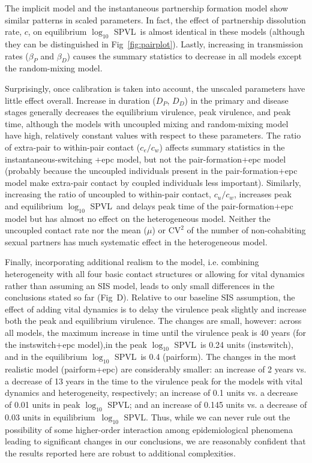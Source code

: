 \documentclass[10pt,letterpaper]{article}
\renewcommand{\figurename}{Fig}
\newcommand{\Lspvl}{$\log_{10}$ SPVL}
\begin{document}
The implicit model and the instantaneous partnership formation model show similar patterns in scaled parameters. In fact, the effect of partnership dissolution rate, $c$, on equilibrium \Lspvl\ is almost identical
in these models (although they can be
distinguished in \figurename~\ref{fig:pairplot}).
Lastly, increasing in transmission rates ($\beta_P$ and $\beta_D$)
causes the summary statistics to decrease in all models except the random-mixing model.

Surprisingly, once calibration
is taken into account, the unscaled parameters have little effect overall.
Increase in duration ($D_P$, $D_D$) in the primary and disease stages generally decreases the equilibrium virulence, peak virulence, and peak time,
although the models with uncoupled mixing and random-mixing model have high, relatively constant values with respect to these parameters.
The ratio of extra-pair to within-pair contact ($c_e/c_w$) affects
summary statistics in the instantaneous-switching +epc model, but not the pair-formation+epc
model (probably because the uncoupled individuals present in the pair-formation+epc
model make extra-pair contact by coupled individuals less important).
Similarly, increasing the ratio of uncoupled to within-pair contact, $c_u/c_w$, increases peak and equilibrium \Lspvl\ and delays peak time of the pair-formation+epc model but has almost no effect on the heterogeneous model.
Neither the uncoupled contact rate nor
the mean ($\mu$) or $\textrm{CV}^2$ of the number of non-cohabiting sexual
partners has much systematic effect in the heterogeneous model.

Finally, incorporating additional realism to the model, i.e.
combining heterogeneity with all four basic contact structures or
allowing for vital dynamics rather than assuming an SIS model,
leads to only small differences in the conclusions stated so far
(\figurename~D). Relative to our baseline SIS assumption, the
effect of adding vital dynamics is to delay the virulence peak
slightly and increase both the peak and equilibrium virulence.
The changes are small, however: across all models, the
maximum increase in time until
the virulence peak is 40 years (for the instswitch+epc model),in 
the peak \Lspvl\ is 0.24 units (instswitch), and in the equilibrium
\Lspvl\ is 0.4 (pairform). The changes in the most realistic
model (pairform+epc) are considerably smaller: 
an increase of 2 years vs. a decrease of 13 years in the
time to the virulence peak for the
models with vital dynamics and heterogeneity, respectively;
an increase of 0.1 units vs. a decrease of 0.01 units in peak \Lspvl;
and an increase of 0.145 units vs. a decrease of 0.03 units
in equilibrium~\Lspvl. Thus, while we can never rule out the
possibility of some higher-order interaction among epidemiological
phenomena leading to significant changes in our conclusions,
we are reasonably confident that the results reported here are
robust to additional complexities.
\end{document}
